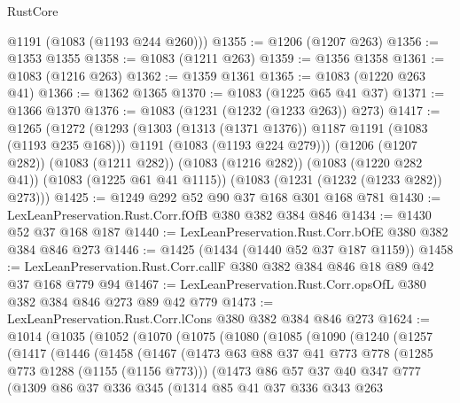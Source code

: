 \begin{lexlean}{RustCore}
\begin{coremodule}
{\begin{coremodule}
{{{{{      @1191
      (@1083 (@1193 @244 @260)))
@1355 := @1206 (@1207 @263)
@1356 := @1353 @1355
@1358 := @1083 (@1211 @263)
@1359 := @1356 @1358
@1361 := @1083 (@1216 @263)
@1362 := @1359 @1361
@1365 := @1083 (@1220 @263 @41)
@1366 := @1362 @1365
@1370 := @1083 (@1225 @65 @41 @37)
@1371 := @1366 @1370
@1376 := @1083 (@1231 (@1232 (@1233 @263)) @273)
@1417 := @1265
    (@1272
      (@1293
        (@1303 (@1313 (@1371 @1376)) @1187 @1191 (@1083 (@1193 @235 @168)))
        @1191
        (@1083 (@1193 @224 @279)))
      (@1206 (@1207 @282))
      (@1083 (@1211 @282))
      (@1083 (@1216 @282))
      (@1083 (@1220 @282 @41))
      (@1083 (@1225 @61 @41 @1115))
      (@1083 (@1231 (@1232 (@1233 @282)) @273)))
@1425 := @1249 @292 @52 @90 @37 @168 @301 @168 @781
@1430 := LexLeanPreservation.Rust.Corr.fOfB @380 @382 @384 @846
@1434 := @1430 @52 @37 @168 @187
@1440 := LexLeanPreservation.Rust.Corr.bOfE @380 @382 @384 @846 @273
@1446 := @1425 (@1434 (@1440 @52 @37 @187 @1159))
@1458 := LexLeanPreservation.Rust.Corr.callF @380 @382 @384 @846 @18 @89 @42 @37 @168 @779 @94
@1467 := LexLeanPreservation.Rust.Corr.opsOfL @380 @382 @384 @846 @273 @89 @42 @779
@1473 := LexLeanPreservation.Rust.Corr.lCons @380 @382 @384 @846 @273
@1624 := @1014
    (@1035
      (@1052
        (@1070
          (@1075
            (@1080
              (@1085
                (@1090
                  (@1240
                    (@1257
                      (@1417
                        (@1446
                          (@1458
                            (@1467
                              (@1473
                                @63
                                @88
                                @37
                                @41
                                @773
                                @778
                                (@1285 @773 @1288 (@1155 (@1156 @773)))
                                (@1473
                                  @86
                                  @57
                                  @37
                                  @40
                                  @347
                                  @777
                                  (@1309
                                    @86
                                    @37
                                    @336
                                    @345
                                    (@1314
                                      @85
                                      @41
                                      @37
                                      @336
                                      @343
                                      @263
}}}}}
\end{coremodule}}
\end{coremodule}
\end{lexlean}
